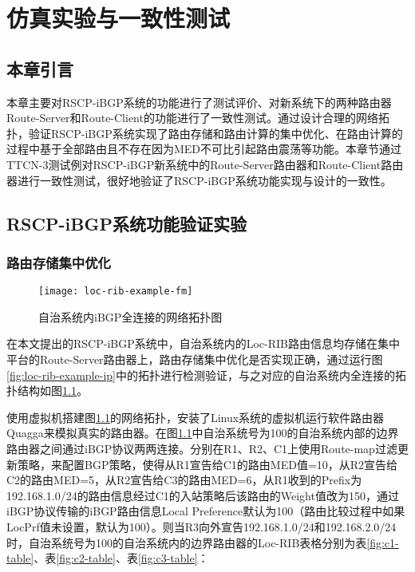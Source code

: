 \chapter{仿真实验与一致性测试}
\label{cha:evaluate}


\section{本章引言}
本章主要对RSCP-iBGP系统的功能进行了测试评价、对新系统下的两种路由器Route-Server和Route-Client的功能进行了一致性测试。通过设计合理的网络拓扑，验证RSCP-iBGP系统实现了路由存储和路由计算的集中优化、在路由计算的过程中基于全部路由且不存在因为MED不可比引起路由震荡等功能。本章节通过TTCN-3测试例对RSCP-iBGP新系统中的Route-Server路由器和Route-Client路由器进行一致性测试，很好地验证了RSCP-iBGP系统功能实现与设计的一致性。

\section{RSCP-iBGP系统功能验证实验}

\subsection{路由存储集中优化}


\begin{figure}
  \centering
  \texttt{[image: loc-rib-example-fm]}
  \caption{自治系统内iBGP全连接的网络拓扑图}
  \label{fig:loc-rib-example-fm}
\end{figure}

在本文提出的RSCP-iBGP系统中，自治系统内的Loc-RIB路由信息均存储在集中平台的Route-Server路由器上，路由存储集中优化是否实现正确，通过运行图\ref{fig:loc-rib-example-ip}中的拓扑进行检测验证，与之对应的自治系统内全连接的拓扑结构如图\ref{fig:loc-rib-example-fm}。

使用虚拟机搭建图\ref{fig:loc-rib-example-fm}的网络拓扑，安装了Linux系统的虚拟机运行软件路由器Quagga来模拟真实的路由器。在图\ref{fig:loc-rib-example-fm}中自治系统号为100的自治系统内部的边界路由器之间通过iBGP协议两两连接。分别在R1、R2、C1上使用Route-map过滤更新策略，来配置BGP策略，使得从R1宣告给C1的路由MED值=10，从R2宣告给C2的路由MED=5，从R2宣告给C3的路由MED=6，从R1收到的Prefix为192.168.1.0/24的路由信息经过C1的入站策略后该路由的Weight值改为150，通过iBGP协议传输的iBGP路由信息Local Preference默认为100（路由比较过程中如果LocPrf值未设置，默认为100）。则当R3向外宣告192.168.1.0/24和192.168.2.0/24时，自治系统号为100的自治系统内的边界路由器的Loc-RIB表格分别为表\ref{fig:c1-table}、表\ref{fig:c2-table}、表\ref{fig:c3-table}：

